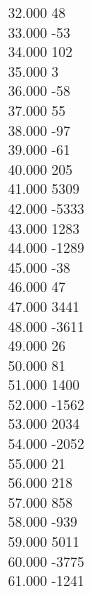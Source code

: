 { 32.000	48 \\
 33.000	-53 \\
 34.000	102 \\
 35.000	3 \\
 36.000	-58 \\
 37.000	55 \\
 38.000	-97 \\
 39.000	-61 \\
 40.000	205 \\
 41.000	5309 \\
 42.000	-5333 \\
 43.000	1283 \\
 44.000	-1289 \\
 45.000	-38 \\
 46.000	47 \\
 47.000	3441 \\
 48.000	-3611 \\
 49.000	26 \\
 50.000	81 \\
 51.000	1400 \\
 52.000	-1562 \\
 53.000	2034 \\
 54.000	-2052 \\
 55.000	21 \\
 56.000	218 \\
 57.000	858 \\
 58.000	-939 \\
 59.000	5011 \\
 60.000	-3775 \\
 61.000	-1241 \\
}
